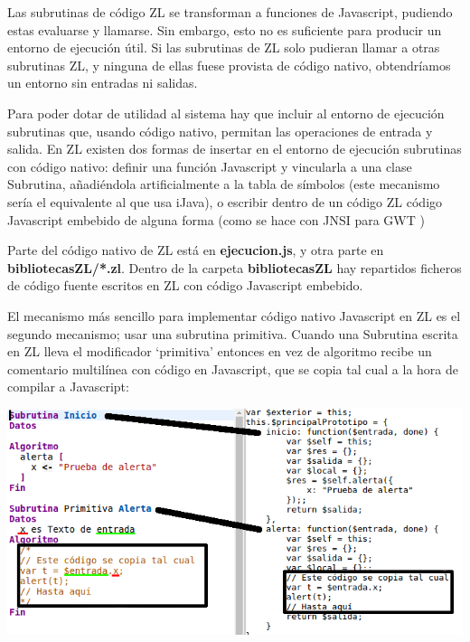 \documentclass{report}
\begin{document}
	\vspace{10px}
	
	Las subrutinas de código ZL se transforman a funciones de Javascript, pudiendo estas evaluarse y llamarse. Sin embargo, esto no es suficiente para producir un entorno de ejecución útil. Si las subrutinas de ZL solo pudieran llamar a otras subrutinas ZL, y ninguna de ellas fuese provista de código nativo, obtendríamos un entorno sin entradas ni salidas. 
	
	\vspace{10px}
	
	Para poder dotar de utilidad al sistema hay que incluir al entorno de ejecución subrutinas que, usando código nativo, permitan las operaciones de entrada y salida. En ZL existen dos formas de insertar en el entorno de ejecución subrutinas con código nativo: definir una función Javascript y vincularla a una clase Subrutina, añadiéndola artificialmente a la tabla de símbolos (este mecanismo sería el equivalente al que usa iJava), o escribir dentro de un código ZL código Javascript embebido de alguna forma (como se hace con JNSI para GWT \cite{jnsigwt}) 
	
	\vspace{10px}
	
	Parte del código nativo de ZL está en \textbf{ejecucion.js}, y otra parte en \textbf{bibliotecasZL/*.zl}. Dentro de la carpeta \textbf{bibliotecasZL} hay repartidos ficheros de código fuente escritos en ZL con código Javascript embebido.
	
	\vspace{10px}
	
	\label{subrutinasprimitivas}
	El mecanismo más sencillo para implementar código nativo Javascript en ZL es el segundo mecanismo; usar una subrutina primitiva. Cuando una Subrutina escrita en ZL lleva el modificador `primitiva' entonces en vez de algoritmo recibe un comentario multilínea con código en Javascript, que se copia tal cual a la hora de compilar a Javascript:
	
	\begin{center}
	\includegraphics[width=1\linewidth]{zlyjs}
	\end{center}
	
\end{document}
